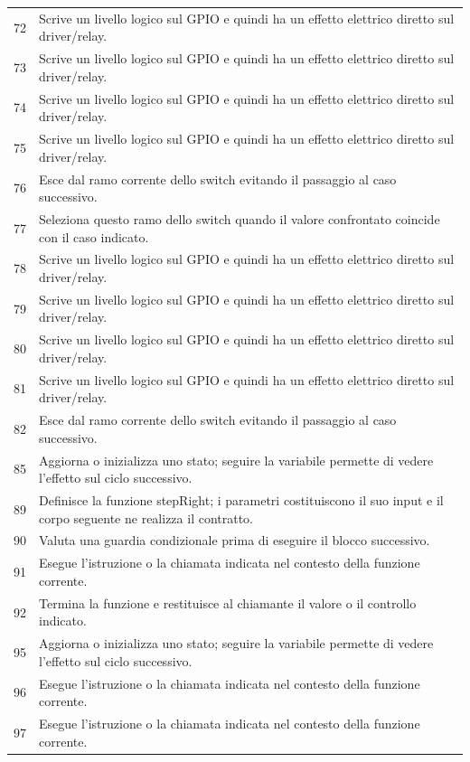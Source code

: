 \documentclass[11pt,a4paper]{article}
\begin{document}
\begin{longtable}{p{}p{}}
72 & Scrive un livello logico sul GPIO e quindi ha un effetto elettrico diretto sul driver/relay. \\
73 & Scrive un livello logico sul GPIO e quindi ha un effetto elettrico diretto sul driver/relay. \\
74 & Scrive un livello logico sul GPIO e quindi ha un effetto elettrico diretto sul driver/relay. \\
75 & Scrive un livello logico sul GPIO e quindi ha un effetto elettrico diretto sul driver/relay. \\
76 & Esce dal ramo corrente dello switch evitando il passaggio al caso successivo. \\
77 & Seleziona questo ramo dello switch quando il valore confrontato coincide con il caso indicato. \\
78 & Scrive un livello logico sul GPIO e quindi ha un effetto elettrico diretto sul driver/relay. \\
79 & Scrive un livello logico sul GPIO e quindi ha un effetto elettrico diretto sul driver/relay. \\
80 & Scrive un livello logico sul GPIO e quindi ha un effetto elettrico diretto sul driver/relay. \\
81 & Scrive un livello logico sul GPIO e quindi ha un effetto elettrico diretto sul driver/relay. \\
82 & Esce dal ramo corrente dello switch evitando il passaggio al caso successivo. \\
85 & Aggiorna o inizializza uno stato; seguire la variabile permette di vedere l'effetto sul ciclo successivo. \\
89 & Definisce la funzione stepRight; i parametri costituiscono il suo input e il corpo seguente ne realizza il contratto. \\
90 & Valuta una guardia condizionale prima di eseguire il blocco successivo. \\
91 & Esegue l'istruzione o la chiamata indicata nel contesto della funzione corrente. \\
92 & Termina la funzione e restituisce al chiamante il valore o il controllo indicato. \\
95 & Aggiorna o inizializza uno stato; seguire la variabile permette di vedere l'effetto sul ciclo successivo. \\
96 & Esegue l'istruzione o la chiamata indicata nel contesto della funzione corrente. \\
97 & Esegue l'istruzione o la chiamata indicata nel contesto della funzione corrente. \\

\end{longtable}
\end{document}
